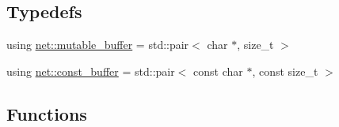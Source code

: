 \subsection*{Typedefs}
\begin{DoxyCompactItemize}
\item 
using \hyperlink{namespacenet_ac0df3fa0efbc044d8a2441906e8f61cb}{net\+::mutable\+\_\+buffer} = std\+::pair$<$ char $\ast$, size\+\_\+t $>$
\item 
using \hyperlink{namespacenet_a05639001760fe5164b163078b5ccc2c0}{net\+::const\+\_\+buffer} = std\+::pair$<$ const char $\ast$, const size\+\_\+t $>$
\end{DoxyCompactItemize}
\subsection*{Functions}
